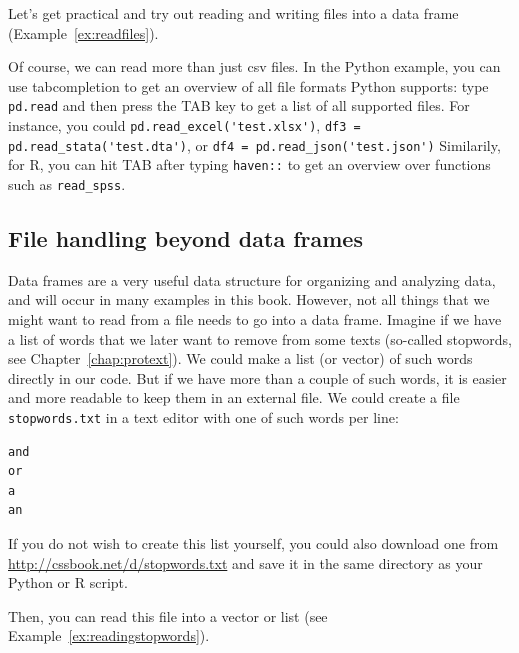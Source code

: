 Let's get practical and try out reading and writing files into a data frame (Example~\ref{ex:readfiles}).


Of course, we can read more than just csv files. In the Python
example, you can use tabcompletion to get an overview of all file
formats Python supports: type \verb|pd.read| and then press the TAB key to
get a list of all supported files. For instance, you could 
\verb|pd.read_excel('test.xlsx')|, \verb|df3 = pd.read_stata('test.dta')|, or
\verb|df4 = pd.read_json('test.json')| Similarily, for R, you can hit TAB
after typing \verb|haven::| to get an overview over functions such as
\verb|read_spss|.

\subsection{File handling beyond data frames}
Data frames are a very useful data structure for organizing and analyzing data, and will occur in many examples in this book.
However, not all things that we might want to read from a file needs to go into a data frame.
Imagine if we have a list of words that we later want to remove from some texts (so-called stopwords, see Chapter~\ref{chap:protext}).
We could make a list (or vector) of such words directly in our code.
But if we have more than a couple of such words, it is easier and more readable to keep them in an external file. We could create a file \texttt{stopwords.txt} in a text editor with one of such words per line:

\begin{lstlisting}
and
or
a
an
\end{lstlisting}

If you do not wish to create this list yourself, you could also
download one from \url{http://cssbook.net/d/stopwords.txt} and save it
in the same directory as your Python or R script.

Then, you can read this file into a vector or list  (see Example~\ref{ex:readingstopwords}).



